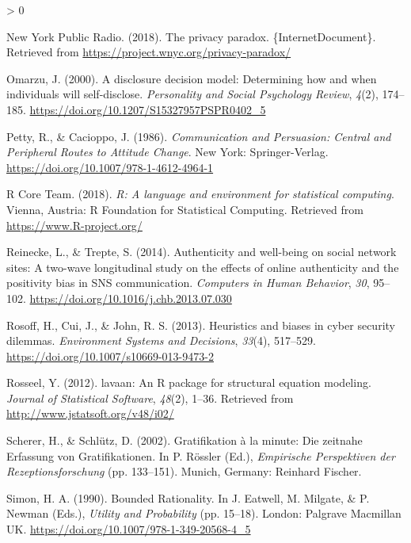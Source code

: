 \documentclass[
  english,
  man,floatsintext]{apa6}
\newlength{\cslhangindent}
\newenvironment{CSLReferences}[2] %
 {%
  \setlength{\parindent}{0pt}
  \ifodd #1 \everypar{\setlength{\hangindent}{\cslhangindent}}\ignorespaces\fi
  \ifnum #2 > 0
  \setlength{\parskip}{#2\baselineskip}
  \fi
 }%
 {}
\begin{document}
\begin{CSLReferences}{1}{0}
\leavevmode\hypertarget{ref-newyorkpublicradioPrivacyParadox2018}{}%
New York Public Radio. (2018). The privacy paradox. \{InternetDocument\}. Retrieved from \url{https://project.wnyc.org/privacy-paradox/}

\leavevmode\hypertarget{ref-omarzuDisclosureDecisionModel2000}{}%
Omarzu, J. (2000). A disclosure decision model: {Determining} how and when individuals will self-disclose. \emph{Personality and Social Psychology Review}, \emph{4}(2), 174--185. \url{https://doi.org/10.1207/S15327957PSPR0402_5}

\leavevmode\hypertarget{ref-pettyCommunicationPersuasionCentral1986}{}%
Petty, R., \& Cacioppo, J. (1986). \emph{Communication and {Persuasion}: {Central} and {Peripheral} {Routes} to {Attitude} {Change}}. New York: Springer-Verlag. \url{https://doi.org/10.1007/978-1-4612-4964-1}

\leavevmode\hypertarget{ref-R-base}{}%
R Core Team. (2018). \emph{R: A language and environment for statistical computing}. Vienna, Austria: R Foundation for Statistical Computing. Retrieved from \url{https://www.R-project.org/}

\leavevmode\hypertarget{ref-reineckeAuthenticityWellbeingSocial2014}{}%
Reinecke, L., \& Trepte, S. (2014). Authenticity and well-being on social network sites: {A} two-wave longitudinal study on the effects of online authenticity and the positivity bias in {SNS} communication. \emph{Computers in Human Behavior}, \emph{30}, 95--102. \url{https://doi.org/10.1016/j.chb.2013.07.030}

\leavevmode\hypertarget{ref-rosoffHeuristicsBiasesCyber2013}{}%
Rosoff, H., Cui, J., \& John, R. S. (2013). Heuristics and biases in cyber security dilemmas. \emph{Environment Systems and Decisions}, \emph{33}(4), 517--529. \url{https://doi.org/10.1007/s10669-013-9473-2}

\leavevmode\hypertarget{ref-R-lavaan}{}%
Rosseel, Y. (2012). {lavaan}: An {R} package for structural equation modeling. \emph{Journal of Statistical Software}, \emph{48}(2), 1--36. Retrieved from \url{http://www.jstatsoft.org/v48/i02/}

\leavevmode\hypertarget{ref-schererGratifikationMinuteZeitnahe2002}{}%
Scherer, H., \& Schlütz, D. (2002). Gratifikation à la minute: {Die} zeitnahe {Erfassung} von {Gratifikationen}. In P. Rössler (Ed.), \emph{Empirische {Perspektiven} der {Rezeptionsforschung}} (pp. 133--151). Munich, Germany: Reinhard Fischer.

\leavevmode\hypertarget{ref-simonBoundedRationality1990}{}%
Simon, H. A. (1990). Bounded {Rationality}. In J. Eatwell, M. Milgate, \& P. Newman (Eds.), \emph{Utility and {Probability}} (pp. 15--18). London: Palgrave Macmillan UK. \url{https://doi.org/10.1007/978-1-349-20568-4_5}


\end{CSLReferences}
\end{document}
